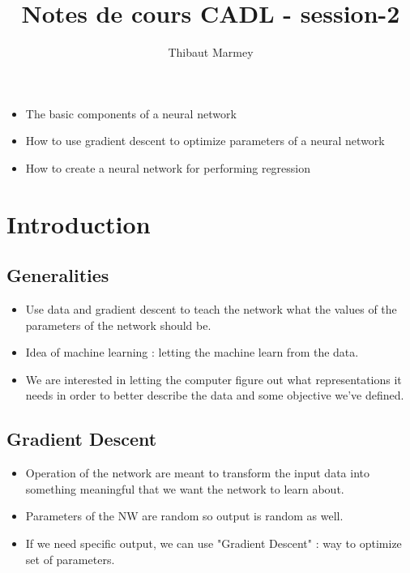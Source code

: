 \documentclass[12pt,a4paper]{article}
\author{Thibaut Marmey}
\title{Notes de cours CADL - session-2}
\begin{document}
	\maketitle

\begin{scriptsize} \begin{itemize}
\item The basic components of a neural network
\item How to use gradient descent to optimize parameters of a neural network
\item How to create a neural network for performing regression
\end{itemize}\end{scriptsize}

\begin{normalsize}
\tableofcontents
\end{normalsize}

\section{Introduction}
\subsection{Generalities}
\begin{itemize}
\item Use data and gradient descent to teach the network what the values of the parameters of the network should be.
\item Idea of machine learning : letting the machine learn from the data.
\item We are interested in letting the computer figure out what representations it needs in order to better describe the data and some objective we've defined.
\end{itemize}
\subsection{Gradient Descent}
\begin{itemize}
\item Operation of the network are meant to transform the input data into something meaningful that we want the network to learn about.
\item Parameters of the NW are random so output is random as well.
\item If we need specific output, we can use "Gradient Descent" : way to optimize set of parameters.
\end{itemize}
\end{document}
